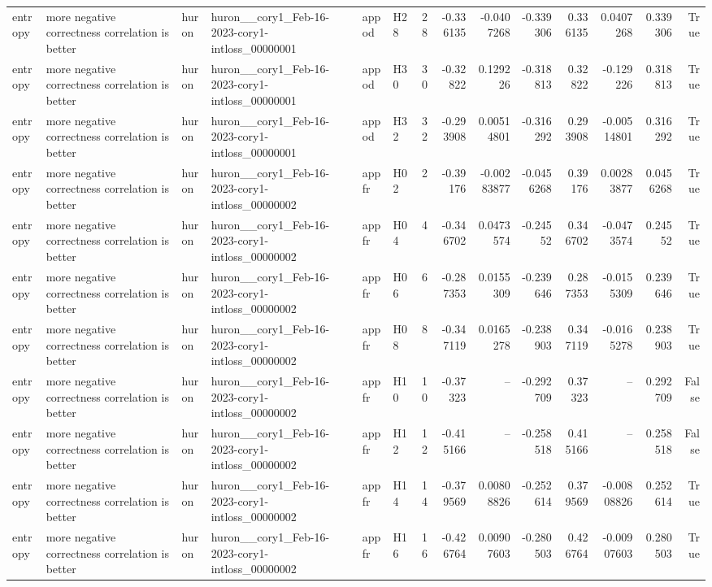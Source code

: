 \begin{longtable}{llllllrrrrrrrr}
entropy & more negative correctness correlation is better & huron & huron\_\_cory1\_Feb-16-2023-cory1-intloss\_00000001 & appod & H28 & 28 & -0.336135 & -0.0407268 & -0.339306 & 0.336135 & 0.0407268 & 0.339306 & True \\
entropy & more negative correctness correlation is better & huron & huron\_\_cory1\_Feb-16-2023-cory1-intloss\_00000001 & appod & H30 & 30 & -0.32822 & 0.129226 & -0.318813 & 0.32822 & -0.129226 & 0.318813 & True \\
entropy & more negative correctness correlation is better & huron & huron\_\_cory1\_Feb-16-2023-cory1-intloss\_00000001 & appod & H32 & 32 & -0.293908 & 0.00514801 & -0.316292 & 0.293908 & -0.00514801 & 0.316292 & True \\
entropy & more negative correctness correlation is better & huron & huron\_\_cory1\_Feb-16-2023-cory1-intloss\_00000002 & appfr & H02 & 2 & -0.39176 & -0.00283877 & -0.0456268 & 0.39176 & 0.00283877 & 0.0456268 & True \\
entropy & more negative correctness correlation is better & huron & huron\_\_cory1\_Feb-16-2023-cory1-intloss\_00000002 & appfr & H04 & 4 & -0.346702 & 0.0473574 & -0.24552 & 0.346702 & -0.0473574 & 0.24552 & True \\
entropy & more negative correctness correlation is better & huron & huron\_\_cory1\_Feb-16-2023-cory1-intloss\_00000002 & appfr & H06 & 6 & -0.287353 & 0.0155309 & -0.239646 & 0.287353 & -0.0155309 & 0.239646 & True \\
entropy & more negative correctness correlation is better & huron & huron\_\_cory1\_Feb-16-2023-cory1-intloss\_00000002 & appfr & H08 & 8 & -0.347119 & 0.0165278 & -0.238903 & 0.347119 & -0.0165278 & 0.238903 & True \\
entropy & more negative correctness correlation is better & huron & huron\_\_cory1\_Feb-16-2023-cory1-intloss\_00000002 & appfr & H10 & 10 & -0.37323 & -- & -0.292709 & 0.37323 & -- & 0.292709 & False \\
entropy & more negative correctness correlation is better & huron & huron\_\_cory1\_Feb-16-2023-cory1-intloss\_00000002 & appfr & H12 & 12 & -0.415166 & -- & -0.258518 & 0.415166 & -- & 0.258518 & False \\
entropy & more negative correctness correlation is better & huron & huron\_\_cory1\_Feb-16-2023-cory1-intloss\_00000002 & appfr & H14 & 14 & -0.379569 & 0.00808826 & -0.252614 & 0.379569 & -0.00808826 & 0.252614 & True \\
entropy & more negative correctness correlation is better & huron & huron\_\_cory1\_Feb-16-2023-cory1-intloss\_00000002 & appfr & H16 & 16 & -0.426764 & 0.00907603 & -0.280503 & 0.426764 & -0.00907603 & 0.280503 & True \\

\end{longtable}
